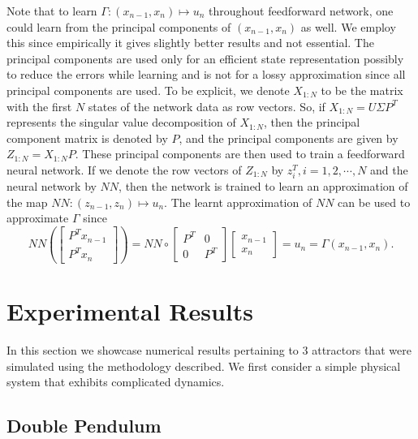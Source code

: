 \documentclass[a4paper,12pt,twoside]{report}
\begin{document}
Note that to learn $\Gamma: (x_{n-1},x_{n}) \mapsto u_n$ throughout feedforward network, one could learn from the principal components of $(x_{n-1},x_{n})$ as well. 
We employ this since empirically it gives slightly better results and not essential.
The principal components are used only for an efficient state representation possibly to reduce the errors while learning and is not for a lossy approximation since all principal components are used.
  To be explicit, we denote $X_{1:N}$ to be the matrix with the first $N$ states of the network data as row vectors. So, if $X_{1:N}=U\Sigma P^T$ represents the singular value decomposition of $X_{1:N}$, then the principal component matrix is denoted by $P$, and the principal components are given by 
 $Z_{1:N}=X_{1:N}P.$
These principal components are then used to train a feedforward neural network. If we denote the row vectors of $Z_{1:N}$ by 
$z_i^T, i=1,2,\cdots,N$ and the neural network by $NN$, then the network is trained to learn an approximation of the map
$NN: (z_{n-1},z_n) \mapsto  u_n.
$
The learnt approximation of $NN$ can be used to approximate $\Gamma$ since 
$$
NN\left( \begin{bmatrix} 
P^Tx_{n-1} \\
P^Tx_n
\end{bmatrix}
\right) = NN \circ 
\begin{bmatrix}
P^T & 0 \\
0 & P^T 
\end{bmatrix}\begin{bmatrix}
x_{n-1}\\
x_n
\end{bmatrix} = u_n = \Gamma(x_{n-1},x_n).
$$


\section{Experimental Results}
In this section we showcase numerical results pertaining to 3 attractors that were simulated using the methodology described. We first consider a simple physical system that exhibits complicated dynamics.
\subsection{Double Pendulum}
\end{document}
